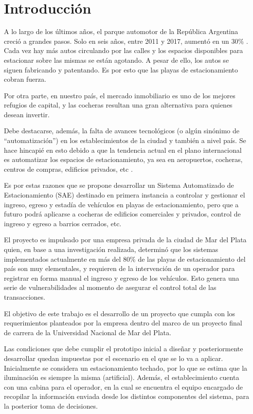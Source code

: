 \chapter{Introducción}  \label{cap:intro}


A lo largo de los últimos años, el parque automotor de la República Argentina creció a grandes pasos. Solo en seis años, entre 2011 y 2017, aumentó en un 30\% \cite{Noticia1}. Cada vez hay más autos circulando por las calles y los espacios disponibles para estacionar sobre las mismas se están agotando. A pesar de ello, los autos se siguen fabricando y patentando. Es por esto que las playas de estacionamiento cobran fuerza.

Por otra parte, en nuestro país, el mercado inmobiliario es uno de los mejores refugios de capital, y las cocheras resultan una gran alternativa para quienes desean invertir\cite{Noticia2}.

Debe destacarse, además, la falta de avances tecnológicos \textcolor{mPurple}{(o algún sinónimo de “automatización”)} en los establecimientos de la ciudad y también a nivel país. Se hace hincapié en esto debido a que la tendencia actual en el plano internacional es automatizar los espacios de estacionamiento, ya sea en aeropuertos, cocheras, centros de compras, edificios privados, etc \cite{kinouwell}.

Es por estas razones que se propone desarrollar un Sistema Automatizado de Estacionamiento (SAE) destinado en primera instancia a controlar y gestionar el ingreso, egreso y estadía de vehículos en playas de estacionamiento, pero que a futuro podrá aplicarse a cocheras de edificios comerciales y privados, control de ingreso y egreso a barrios cerrados, etc. 

El proyecto es impulsado por una empresa privada de la ciudad de Mar del Plata quien, en base a una investigación realizada, determinó que los sistemas implementados actualmente en más del 80\% de las playas de estacionamiento del país son muy elementales, y requieren de la intervención de un operador para registrar en forma manual el ingreso y egreso de los vehículos. Esto genera una serie de vulnerabilidades al momento de asegurar el control total de las transacciones.

El objetivo de este trabajo es el desarrollo de un proyecto que cumpla con los requerimientos planteados por la empresa dentro del marco de un proyecto final de carrera de la Universidad Nacional de Mar del Plata.

Las condiciones que debe cumplir el prototipo inicial a diseñar y posteriormente desarrollar quedan impuestas por el escenario en el que se lo va a aplicar. Inicialmente se considera un estacionamiento techado, por lo que se estima que la iluminación es siempre la misma (artificial). Además, el establecimiento cuenta con una cabina para el operador, en la cual se encuentra el equipo encargado de recopilar la información enviada desde los distintos componentes del sistema, para la posterior toma de decisiones. 

